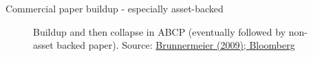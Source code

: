 \begin{frame}{Commercial paper buildup - especially asset-backed}

\begin{figure}
\begin{center}


\caption{Buildup and then collapse in ABCP (eventually followed by non-asset backed paper). Source: \href{https://www.princeton.edu/~markus/research/papers/liquidity_credit_crunch.pdf}{Brunnermeier (2009); Bloomberg}}

\end{center}
\end{figure}

\end{frame}



